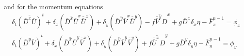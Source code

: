 \documentclass[oribibl]{llncs}
\begin{document}
and for the momentum equations
\begin{eqnarray}
\delta_t \overline{(\overline{D}^x \overline{U})}^t + \delta_x (\overline{\overline{D}^x \overline{U}}^x \overline{\overline{U}}^x) +  \delta_y (\overline{\overline{D}^y \overline{V}}^x \overline{\overline{U}}^y) - \overline{f \overline{\overline{V}}^y D}^x +g\overline{D}^x \delta_x \eta - \overline{F}_x^{n-1}= \phi_x \nonumber \\
\delta_t \overline{(\overline{D}^y \overline{V})}^t + \delta_x (\overline{\overline{D}^x \overline{U}}^y \overline{\overline{V}}^x) +  \delta_y (\overline{\overline{D}^y \overline{V}}^y \overline{\overline{V}}^y) + \overline{f \overline{\overline{U}}^x D}^y +g\overline{D}^y \delta_y \eta - \overline{F}_y^{n-1}= \phi_y
 \end{eqnarray}
\\ \nonumber
\\ \nonumber
\\ \nonumber
\\ \nonumber
\\ \nonumber
\\ \nonumber
\\ \nonumber


\clearpage
{}
\areaset{\dimexpr \textwidth+.5\paperwidth}{\textheight}
\end{document}
